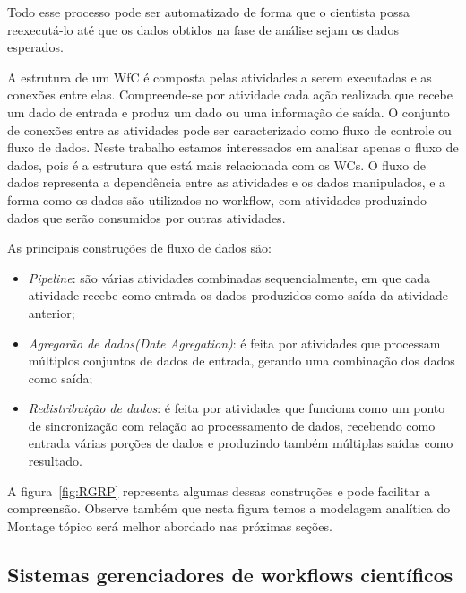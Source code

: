 		Todo esse processo pode ser automatizado de forma que o cientista possa reexecutá-lo até que os dados obtidos na fase de análise sejam os dados esperados. 
		
		A estrutura de um WfC é composta pelas atividades a serem executadas e as conexões entre elas. Compreende-se por atividade cada ação realizada que recebe um dado de entrada e produz um dado ou uma informação de saída. O conjunto de conexões entre as atividades pode ser caracterizado como fluxo de controle ou fluxo de dados. Neste trabalho estamos interessados em analisar apenas o fluxo de dados, pois é a estrutura que está mais relacionada com os WCs. O fluxo de dados representa a dependência entre as atividades e os dados manipulados, e a forma como os dados são utilizados no workflow, com atividades produzindo dados que serão consumidos por outras atividades\cite{Teixeira2013}. 

		As principais construções de fluxo de dados são\cite{Teixeira2013}:
		
	\begin{itemize}
		\item \textit{Pipeline}: são várias atividades combinadas sequencialmente, em que cada atividade recebe como entrada os dados produzidos como saída da atividade anterior;

		
		\item \textit{Agregarão de dados(Date Agregation)}: é feita por atividades que processam múltiplos conjuntos de dados de entrada, gerando uma combinação dos dados como saída;
		
		\item \textit{Redistribuição de dados}: é feita por atividades que funciona como um ponto de sincronização com relação ao processamento de dados, recebendo como entrada várias porções de dados e produzindo também múltiplas saídas como resultado.
	\end{itemize}
		
	A figura~\ref{fig:RGRP} representa algumas dessas construções e pode facilitar a compreensão. Observe também que nesta figura temos a modelagem analítica do Montage tópico será melhor abordado nas próximas seções.
			
	\subsection{Sistemas gerenciadores de workflows científicos}

